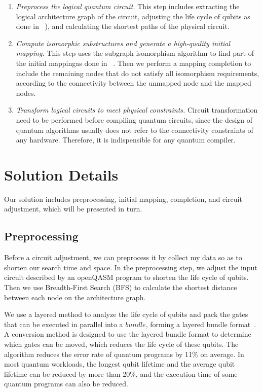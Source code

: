 \documentclass[runningheads]{llncs}
\begin{document}
\begin{enumerate}
	\item \emph{Preprocess the logical quantum circuit.} 
	This step includes extracting the logical architecture graph of the circuit, adjusting the life cycle of qubits as done in ~\cite{2019Zhang}),  and calculating the shortest paths of the physical circuit.
	\item \emph{Compute isomorphic substructures and generate a high-quality initial mapping.}
	This step uses the subgraph isomorphism algorithm to find part of the initial mappingas done in ~\cite{Sun2020}.
	Then we perform a mapping completion to include the remaining nodes that do not satisfy all isomorphism requirements, according to the connectivity between the unmapped node and the mapped nodes.
	\item \emph{Transform logical circuits to meet physical constraints.}
	Circuit transformation need to be performed before compiling quantum circuits, since the design of quantum algorithms usually does not refer to the connectivity constraints of any hardware. Therefore, it is indispensible for any quantum compiler.
\end{enumerate}

\section{Solution Details}
\label{Solution Details}
Our solution includes preprocessing, initial mapping, completion, and circuit adjustment, which will be presented in turn.
\subsection{Preprocessing}
Before a circuit adjustment, we can preprocess it by collect my data so as to shorten our search time and space. In the preprocessing step, we adjust the input circuit described by an openQASM program to shorten the life cycle of qubits. Then we use Breadth-First Search (BFS) to calculate the shortest distance between each node on the architecture graph.

We use a layered method to analyze the life cycle of qubits and pack the gates that can be executed in parallel into a $bundle$, forming a layered bundle format~\cite{2019Zhang}.
A conversion method is designed to use the layered bundle format to determine which gates can be moved, which reduces the life cycle of these qubits. The algorithm reduces the error rate of quantum programs by 11\% on average. In most quantum workloads, the longest qubit lifetime and the average qubit lifetime can be reduced by more than 20\%, and the execution time of some quantum programs can also be reduced.
\end{document}
